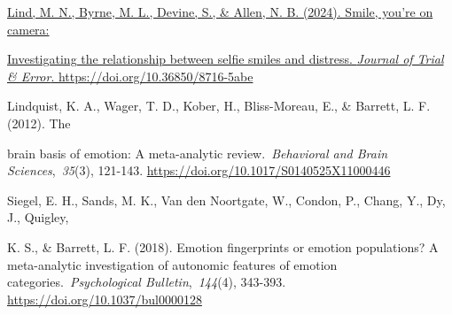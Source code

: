 \documentclass[authordate, empirical]{jote-new-article}
\begin{document}
	\underline{Lind, M. N., Byrne, M. L., Devine, S., \& Allen, N. B. (2024). Smile, you're on camera: }



	\underline{Investigating the relationship between selfie smiles and distress. }\underline{\emph{Journal of Trial \& Error}}\underline{. }\href{https://doi.org/10.36850/8716-5abe}{https://doi.org/10.36850/8716-5abe}



	Lindquist, K. A., Wager, T. D., Kober, H., Bliss-Moreau, E., \& Barrett, L. F. (2012). The



	brain basis of emotion: A meta-analytic review. \emph{Behavioral and Brain Sciences}, \emph{35}(3), 121-143. \href{https://doi.org/10.1017/S0140525X11000446}{https://doi.org/10.1017/S0140525X11000446}



	Siegel, E. H., Sands, M. K., Van den Noortgate, W., Condon, P., Chang, Y., Dy, J., Quigley,



	K. S., \& Barrett, L. F. (2018). Emotion fingerprints or emotion populations? A meta-analytic investigation of autonomic features of emotion categories. \emph{Psychological Bulletin}, \emph{144}(4), 343-393. \href{https://doi.org/10.1037/bul0000128}{https://doi.org/10.1037/bul0000128}
\end{document}
